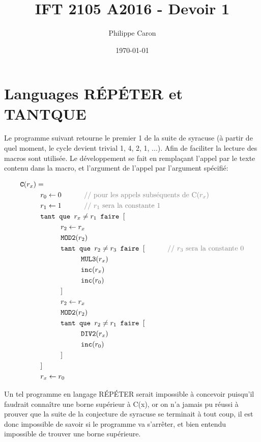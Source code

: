 \documentclass{article}
\title{IFT 2105 A2016 - Devoir 1} %
\author{Philippe Caron}
\date{\today}
\newcommand{\key}[1]{\text{\texttt{#1}}}
\newcommand{\com}[1]{\text{\color{gray} \hspace{1cm} // #1}}
\newcommand{\name}[1]{\text{\bf \texttt{#1}}}
\newcommand\tab[1][1cm]{\hspace*{#1}}
\begin{document}
\maketitle
\section{Languages RÉPÉTER et TANTQUE}
Le programme suivant retourne le premier 1 de la suite de syracuse (à partir de quel moment, le cycle devient trivial 1, 4, 2, 1, ...). Afin de faciliter la lecture des macros sont utilisée. Le développement se fait en remplaçant l'appel par le texte contenu dans la macro, et l'argument de l'appel par l'argument spécifié:

\vspace{2cm}

\begin{align*}
  &\name{C}(r_x) =\\
  &\tab{}r_0 \leftarrow 0 \com{pour les appels subséquents de C($r_x$)} \\
  &\tab{}r_1 \leftarrow 1 \com{$r_1$ sera la constante 1}\\
  &\tab{}\key{tant que } r_x \neq r_1 \key{ faire } [\\
    &\tab{}\tab{}r_2 \leftarrow r_x\\
    &\tab{}\tab{}\key{MOD2}(r_2)\\
    &\tab{}\tab{}\key{tant que } r_2 \neq r_3 \key{ faire } [ \com{$r_3$ sera la constante 0}\\
      &\tab{}\tab{}\tab{}\key{MUL3}(r_x)\\
      &\tab{}\tab{}\tab{}\key{inc}(r_x)\\
      &\tab{}\tab{}\tab{}\key{inc}(r_0)\\
      &\tab{}\tab{}]\\
    &\tab{}\tab{}r_2 \leftarrow r_x\\
    &\tab{}\tab{}\key{MOD2}(r_2)\\
    &\tab{}\tab{}\key{tant que } r_2 \neq r_1 \key{ faire } [\\
      &\tab{}\tab{}\tab{}\key{DIV2}(r_x)\\
      &\tab{}\tab{}\tab{}\key{inc}(r_0)\\
      &\tab{}\tab{}]\\
    &\tab{}]\\
  &\tab{}r_x \leftarrow r_0\\
\end{align*}

Un tel programme en langage RÉPÉTER serait impossible à concevoir puisqu'il faudrait connaître une borne supérieur à C(x), or on n'a jamais pu réussi à prouver que la suite de la conjecture de syracuse se terminait à tout coup, il est donc impossible de savoir si le programme va s'arrêter, et bien entendu impossible de trouver une borne supérieure.
\end{document}
